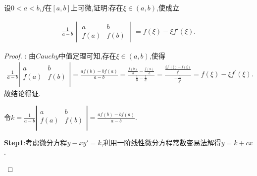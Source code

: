 \documentclass[lang=cn,newtx,10pt,scheme=chinese]{elegantbook}
\begin{document}
\begin{exercise}
    设\(0 < a < b\),\(f\)在\([a, b]\)上可微,证明:存在\(\xi\in(a, b)\),使成立
    
    \begin{align}
        \frac{1}{a - b} \begin{vmatrix}
    a & b \\
    f(a) & f(b)
    \end{vmatrix} = f(\xi) - \xi f'(\xi).
        \nonumber
    \end{align}
\end{exercise}
\begin{proof}
    {\color{blue} }:
    由$Cauchy$中值定理可知,存在$\xi\in(a,b)$,使得
    \begin{align}
        \frac{1}{a-b}\left| \begin{matrix}
            a&		b\\
            f(a)&		f(b)\\
        \end{matrix} \right|=\frac{af\left( b \right) -bf\left( a \right)}{a-b}=\frac{\frac{f(b)}{b}-\frac{f(a)}{a}}{\frac{1}{b}-\frac{1}{a}}=\frac{\frac{\xi f^{\prime}(\xi )-f(\xi )}{\xi ^2}}{-\frac{1}{\xi ^2}}=f(\xi )-\xi f^{\prime}(\xi ).        
        \nonumber
    \end{align}
    故结论得证.

\begin{note}
    令$k=\frac{1}{a-b}\left| \begin{matrix}
        a&		b\\
        f(a)&		f(b)\\
    \end{matrix} \right|=\frac{af\left( b \right) -bf\left( a \right)}{a-b}$.

        \textbf{Step1}:考虑微分方程$y-xy'=k$,利用一阶线性微分方程常数变易法解得$y=k+cx$.


\end{note}
\end{proof}
\end{document}
